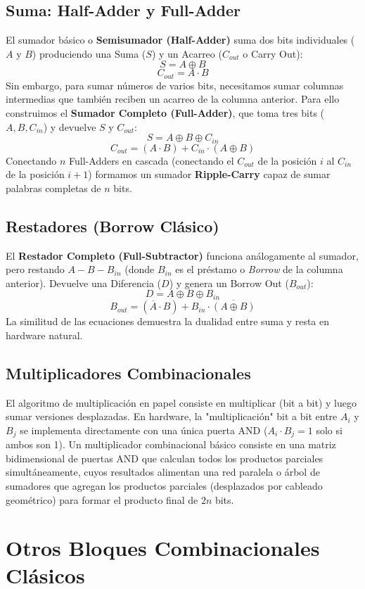 \subsection{Suma: Half-Adder y Full-Adder}
El sumador básico o \textbf{Semisumador (Half-Adder)} suma dos bits individuales ($A$ y $B$) produciendo una Suma ($S$) y un Acarreo ($C_{out}$ o Carry Out):
\[ S = A \oplus B \]
\[ C_{out} = A \cdot B \]
Sin embargo, para sumar números de varios bits, necesitamos sumar columnas intermedias que también reciben un acarreo de la columna anterior. Para ello construimos el \textbf{Sumador Completo (Full-Adder)}, que toma tres bits ($A, B, C_{in}$) y devuelve $S$ y $C_{out}:$
\[ S = A \oplus B \oplus C_{in} \]
\[ C_{out} = (A \cdot B) + C_{in} \cdot (A \oplus B) \]
Conectando $n$ Full-Adders en cascada (conectando el $C_{out}$ de la posición $i$ al $C_{in}$ de la posición $i+1$) formamos un sumador \textbf{Ripple-Carry} capaz de sumar palabras completas de $n$ bits.

\subsection{Restadores (Borrow Clásico)}
El \textbf{Restador Completo (Full-Subtractor)} funciona análogamente al sumador, pero restando $A - B - B_{in}$ (donde $B_{in}$ es el préstamo o \textit{Borrow} de la columna anterior). Devuelve una Diferencia ($D$) y genera un Borrow Out ($B_{out}$):
\[ D = A \oplus B \oplus B_{in} \]
\[ B_{out} = (\overline{A} \cdot B) + B_{in} \cdot \overline{(A \oplus B)} \]
La similitud de las ecuaciones demuestra la dualidad entre suma y resta en hardware natural.

\subsection{Multiplicadores Combinacionales}
El algoritmo de multiplicación en papel consiste en multiplicar (bit a bit) y luego sumar versiones desplazadas. En hardware, la "multiplicación" bit a bit entre $A_i$ y $B_j$ se implementa directamente con una única puerta AND ($A_i \cdot B_j = 1$ solo si ambos son 1).
Un multiplicador combinacional básico consiste en una matriz bidimensional de puertas AND que calculan todos los productos parciales simultáneamente, cuyos resultados alimentan una red paralela o árbol de sumadores que agregan los productos parciales (desplazados por cableado geométrico) para formar el producto final de $2n$ bits.

\section{Otros Bloques Combinacionales Clásicos}

